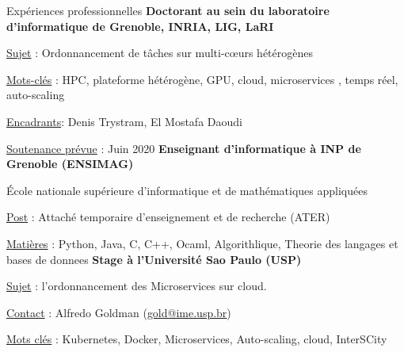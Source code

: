 \begin{rubric}{Expériences professionnelles}
%
%
%
\entry*[]
    \textbf{Doctorant au sein du laboratoire d'informatique de Grenoble, INRIA, LIG, LaRI}
    \hfill {} 
    \par \underline{Sujet} : Ordonnancement de tâches sur multi-cœurs hétérogènes
    \hfill {}
    \par \underline{Mots-clés} : HPC, plateforme hétérogène, GPU, cloud, microservices , temps réel, auto-scaling
        \hfill {}
    \par \underline{Encadrants}: Denis Trystram, El Mostafa Daoudi
    \par \underline{Soutenance prévue} : Juin 2020
%
%
\entry*[]
    \textbf{Enseignant d'informatique à INP de Grenoble (ENSIMAG)} 
     \hfill {} 
    \par École nationale supérieure d'informatique et de mathématiques appliquées 
    \hfill {}
    \par \underline{Post} : Attaché temporaire d'enseignement et de recherche (ATER)
    \hfill {}
    \par \underline{Matières} : Python, Java, C, C++, Ocaml, Algorithlique, Theorie des langages et bases de donnees%
\entry*[]
    \textbf{Stage à l'Université Sao Paulo (USP)} %
     \hfill{} 
    \par \underline{Sujet} : l'ordonnancement des Microservices sur cloud.
    \hfill {}
    \par \underline{Contact} : Alfredo Goldman (\href{mailto:gold@ime.usp.br}{gold@ime.usp.br})
   \hfill {}
	\par \underline{Mots clés} : Kubernetes, Docker, Microservices, Auto-scaling, cloud, InterSCity

\end{rubric}
